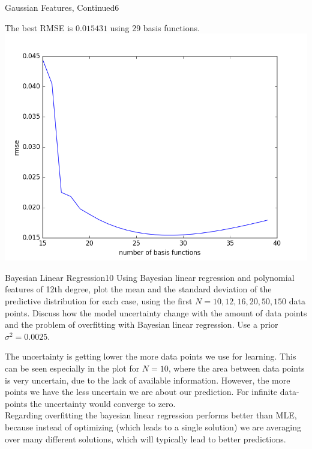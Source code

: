 \begin{questions}
\begin{question}{Gaussian Features, Continued}{6}
\begin{answer}\end{answer}
The best RMSE is $0.015431$ using 29 basis functions. \\
\centering \includegraphics[width=1.0\linewidth]{img/31c_rmse}\label{fig:gaussians_rmse}

\end{question}


\begin{question}{Bayesian Linear Regression}{10}
Using Bayesian linear regression and polynomial features of 12th degree, plot the mean and the standard deviation of the predictive distribution for each case, using the first $N={10, 12, 16, 20, 50, 150}$ data points.
Discuss how the model uncertainty change with the amount of data points and the problem of overfitting with Bayesian linear regression. Use a prior $\sigma^2=0.0025$.

\begin{answer}
The uncertainty is getting lower the more data points we use for learning. This can be seen especially in the plot for $N=10$, where the area between data points is very uncertain, due to the lack of available information. However, the more points we have the less uncertain we are about our prediction. For infinite data-points the uncertainty would converge to zero.\\
Regarding overfitting the bayesian linear regression performs better than MLE, because instead of optimizing (which leads to a single solution) we are averaging over many different solutions, which will typically lead to better predictions.


\end{answer}
\end{question}
\end{questions}
